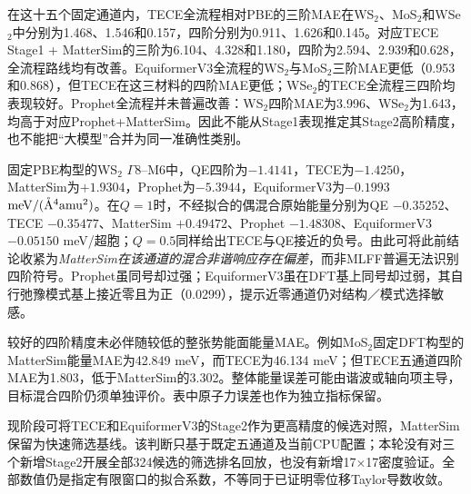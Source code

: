 在这十五个固定通道内，TECE全流程相对PBE的三阶MAE在WS$_2$、MoS$_2$和WSe$_2$中分别为1.468、1.546和0.157，四阶分别为0.911、1.626和0.145。对应TECE Stage1 + MatterSim的三阶为6.104、4.328和1.180，四阶为2.594、2.939和0.628，全流程路线均有改善。EquiformerV3全流程的WS$_2$与MoS$_2$三阶MAE更低（0.953和0.868），但TECE在这三材料的四阶MAE更低；WSe$_2$的TECE全流程三四阶均表现较好。Prophet全流程并未普遍改善：WS$_2$四阶MAE为3.996、WSe$_2$为1.643，均高于对应Prophet+MatterSim。因此不能从Stage1表现推定其Stage2高阶精度，也不能把“大模型”合并为同一准确性类别。

固定PBE构型的WS$_2$ $\Gamma8$--M6中，QE四阶为$-1.4141$，TECE为$-1.4250$，MatterSim为$+1.9304$，Prophet为$-5.3944$，EquiformerV3为$-0.1993$ $\mathrm{meV}/(\mathring{\mathrm A}^{4}\mathrm{amu}^{2})$。在$Q=1$时，不经拟合的偶混合原始能量分别为QE $-0.35252$、TECE $-0.35477$、MatterSim $+0.49472$、Prophet $-1.48308$、EquiformerV3 $-0.05150$ meV/超胞；$Q=0.5$同样给出TECE与QE接近的负号。由此可将此前结论收紧为\emph{MatterSim在该通道的混合非谐响应存在偏差}，而非MLFF普遍无法识别四阶符号。Prophet虽同号却过强；EquiformerV3虽在DFT基上同号却过弱，其自行弛豫模式基上接近零且为正（0.0299），提示近零通道仍对结构／模式选择敏感。

较好的四阶精度未必伴随较低的整张势能面能量MAE。例如MoS$_2$固定DFT构型的MatterSim能量MAE为42.849 meV，而TECE为46.134 meV；但TECE五通道四阶MAE为1.803，低于MatterSim的3.302。整体能量误差可能由谐波或轴向项主导，目标混合四阶仍须单独评价。表中原子力误差也作为独立指标保留。

现阶段可将TECE和EquiformerV3的Stage2作为更高精度的候选对照，MatterSim保留为快速筛选基线。该判断只基于既定五通道及当前CPU配置；本轮没有对三个新增Stage2开展全部324候选的筛选排名回放，也没有新增17$\times$17密度验证。全部数值仍是指定有限窗口的拟合系数，不等同于已证明零位移Taylor导数收敛。
